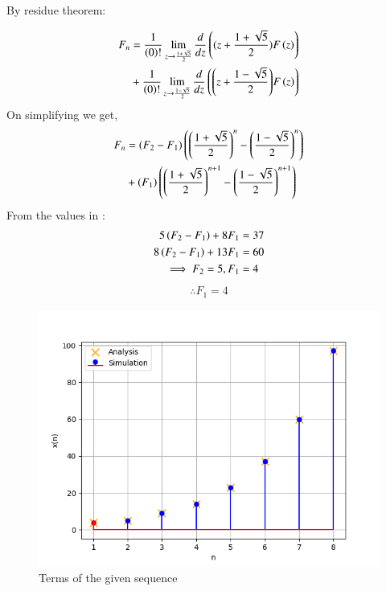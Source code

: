 \documentclass[journal,12pt]{IEEEtran}
\begin{document}
	By residue theorem:
	
	\newpage
	
	\begin{align}
		\notag F_n&=\frac{1}{\left(0\right)!}\lim\limits_{z\to {\frac{1+\sqrt{5}}{2}}}\frac{d}{dz}\left({(z+\frac{1+\sqrt{5}}{2})}F\left(z\right)\right)\\ &+ \frac{1}{\left(0\right)!}\lim\limits_{z\to \frac{1-\sqrt{5}}{2}}\frac{d}{dz}\left({\left(z+\frac{1-\sqrt{5}}{2}\right)}F\left(z\right)\right)
	\end{align}
	On simplifying we get,
	\begin{align}
		\notag F_n &= \left(F_2-F_1\right)\left(\left(\frac{1+\sqrt{5}}{2}\right)^n-\left(\frac{1-\sqrt{5}}{2}\right)^n\right)\\ &+ \left(F_1\right)\left(\left(\frac{1+\sqrt{5}}{2}\right)^{n+1}-\left(\frac{1-\sqrt{5}}{2}\right)^{n+1}\right)
	\end{align}
	From the values in :
	\begin{align}
		5 \left(F_2-F_1\right) + 8 F_1 &=37\\
		8 \left(F_2-F_1\right) + 13 F_1 &=60\\
		\implies F_2 =5, F_1 &=4
	\end{align}
	\begin{align}
		\therefore {F_1=4}
	\end{align}
	\begin{figure}[ht]
		\includegraphics[width = \columnwidth]{figs/fig4}
		\caption{Terms of the given sequence}
		\centering
		\label{fig: fig4}
	\end{figure}
	
\end{document}
